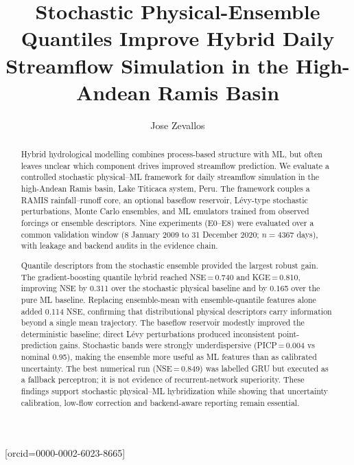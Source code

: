 \documentclass[a4paper,fleqn]{cas-sc}
\begin{document}
\let\WriteBookmarks\relax
\def\floatpagepagefraction{1}
\def\textpagefraction{.001}


\title[mode = title]{Stochastic Physical-Ensemble Quantiles Improve Hybrid Daily Streamflow Simulation in the High-Andean Ramis Basin}

\author[1]{Jose Zevallos}[orcid=0000-0002-6023-8665]
\cormark[1]



\begin{abstract}
Hybrid hydrological modelling combines process-based structure with ML, but often leaves unclear which component drives improved streamflow prediction. We evaluate a controlled stochastic physical--ML framework for daily streamflow simulation in the high-Andean Ramis basin, Lake Titicaca system, Peru. The framework couples a RAMIS rainfall--runoff core, an optional baseflow reservoir, L\'{e}vy-type stochastic perturbations, Monte Carlo ensembles, and ML emulators trained from observed forcings or ensemble descriptors. Nine experiments (E0--E8) were evaluated over a common validation window (8 January 2009 to 31 December 2020; $n=4367$ days), with leakage and backend audits in the evidence chain.

Quantile descriptors from the stochastic ensemble provided the largest robust gain. The gradient-boosting quantile hybrid reached NSE\,=\,0.740 and KGE\,=\,0.810, improving NSE by 0.311 over the stochastic physical baseline and by 0.165 over the pure ML baseline. Replacing ensemble-mean with ensemble-quantile features alone added 0.114 NSE, confirming that distributional physical descriptors carry information beyond a single mean trajectory. The baseflow reservoir modestly improved the deterministic baseline; direct L\'{e}vy perturbations produced inconsistent point-prediction gains. Stochastic bands were strongly underdispersive (PICP\,=\,0.004 vs nominal 0.95), making the ensemble more useful as ML features than as calibrated uncertainty. The best numerical run (NSE\,=\,0.849) was labelled GRU but executed as a fallback perceptron; it is not evidence of recurrent-network
superiority. These findings support stochastic physical--ML hybridization while showing that uncertainty calibration, low-flow correction and backend-aware reporting remain essential.
\end{abstract}
\end{document}
